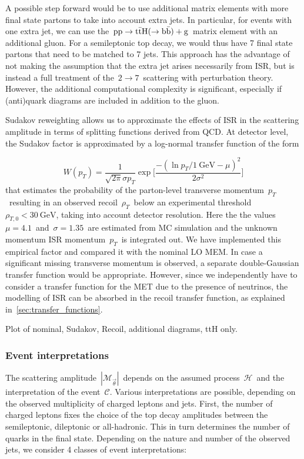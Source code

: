 A possible step forward would be to use additional matrix elements with more final state partons to take into account extra jets. In particular, for events with one extra jet, we can use the~$\mathrm{pp} \rightarrow \mathrm{t} \bar{\mathrm{t}} \mathrm{H} (\rightarrow \mathrm{b}\bar{\mathrm{b}}) + \mathrm{g}$~matrix element with an additional gluon. For a semileptonic top decay, we would thus have 7 final state partons that need to be matched to 7 jets. This approach has the advantage of not making the assumption that the extra jet arises necessarily from ISR, but is instead a full treatment of the~$2 \rightarrow 7$~scattering with perturbation theory. However, the additional computational complexity is significant, especially if (anti)quark diagrams are included in addition to the gluon.

Sudakov reweighting allows us to approximate the effects of ISR in the scattering amplitude in terms of splitting functions derived from QCD. At detector level, the Sudakov factor is approximated by a log-normal transfer function of the form

\begin{equation}
W(p_T) = \frac{1}{\sqrt{2\pi} \sigma p_T} \exp \biggl[ \frac{-(\ln{p_T/1~\mathrm{GeV}} - \mu)^2}{2\sigma^2}\biggr]
\end{equation}
that estimates the probability of the parton-level transverse momentum~$p_T$~resulting in an observed recoil~$\rho_T$~below an experimental threshold~$\rho_{T,0} < 30~\mathrm{GeV}$, taking into account detector resolution. Here the the values~$\mu = 4.1$~and~$\sigma = 1.35$~are estimated from MC simulation and the unknown momentum ISR momentum~$p_T$~is integrated out. We have implemented this empirical factor and compared it with the nominal LO MEM. In case a significant missing transverse momentum is observed, a separate double-Gaussian transfer function would be appropriate. However, since we independently have to consider a transfer function for the MET due to the presence of neutrinos, the modelling of ISR can be absorbed in the recoil transfer function, as explained in~\cref{sec:transfer_functions}.

\fixme Plot of nominal, Sudakov, Recoil, additional diagrams, ttH only.

\subsubsection{Event interpretations}
\label{sec:event_interpretation}

The scattering amplitude~$|\mathcal{M}_{\vec{\theta}}|$~depends on the assumed process~$\mathcal{H}$~and the interpretation of the event~$\mathcal{C}$. Various interpretations are possible, depending on the observed multiplicity of charged leptons and jets. First, the number of charged leptons fixes the choice of the top decay amplitudes between the semileptonic, dileptonic or all-hadronic. This in turn determines the number of quarks in the final state. Depending on the nature and number of the observed jets, we consider 4 classes of event interpretations:

